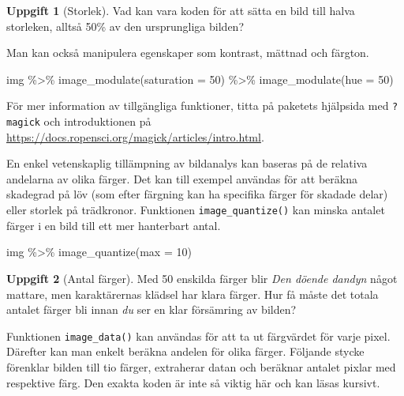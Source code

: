 \documentclass[
]{book}
\newenvironment{Shaded}{\begin{snugshade}}{\end{snugshade}}
\newcommand{\AttributeTok}[1]{\textcolor[rgb]{0.77,0.63,0.00}{#1}}
\newcommand{\DecValTok}[1]{\textcolor[rgb]{0.00,0.00,0.81}{#1}}
\newcommand{\FunctionTok}[1]{\textcolor[rgb]{0.00,0.00,0.00}{#1}}
\newcommand{\NormalTok}[1]{#1}
\newcommand{\SpecialCharTok}[1]{\textcolor[rgb]{0.00,0.00,0.00}{#1}}
\theoremstyle{definition}
\theoremstyle{definition}
\theoremstyle{definition}
\newtheorem{exercise}{Uppgift}[chapter]
\theoremstyle{definition}
\theoremstyle{remark}
\begin{document}
\begin{exercise}[Storlek]
Vad kan vara koden för att sätta en bild till halva storleken, alltså 50\% av den ursprungliga bilden?
\end{exercise}

Man kan också manipulera egenskaper som kontrast, mättnad och färgton.

\begin{Shaded}
\begin{Highlighting}[]
\NormalTok{img }\SpecialCharTok{\%\textgreater{}\%} 
  \FunctionTok{image\_modulate}\NormalTok{(}\AttributeTok{saturation =} \DecValTok{50}\NormalTok{) }\SpecialCharTok{\%\textgreater{}\%} 
  \FunctionTok{image\_modulate}\NormalTok{(}\AttributeTok{hue =} \DecValTok{50}\NormalTok{)}
\end{Highlighting}
\end{Shaded}

För mer information av tillgängliga funktioner, titta på paketets hjälpsida med \texttt{?magick} och introduktionen på \url{https://docs.ropensci.org/magick/articles/intro.html}.

En enkel vetenskaplig tillämpning av bildanalys kan baseras på de relativa andelarna av olika färger. Det kan till exempel användas för att beräkna skadegrad på löv (som efter färgning kan ha specifika färger för skadade delar) eller storlek på trädkronor. Funktionen \texttt{image\_quantize()} kan minska antalet färger i en bild till ett mer hanterbart antal.

\begin{Shaded}
\begin{Highlighting}[]
\NormalTok{img }\SpecialCharTok{\%\textgreater{}\%} \FunctionTok{image\_quantize}\NormalTok{(}\AttributeTok{max =} \DecValTok{10}\NormalTok{)}
\end{Highlighting}
\end{Shaded}

\begin{exercise}[Antal färger]
Med 50 enskilda färger blir \emph{Den döende dandyn} något mattare, men karaktärernas klädsel har klara färger. Hur få måste det totala antalet färger bli innan \emph{du} ser en klar försämring av bilden?
\end{exercise}

Funktionen \texttt{image\_data()} kan användas för att ta ut färgvärdet för varje pixel. Därefter kan man enkelt beräkna andelen för olika färger. Följande stycke förenklar bilden till tio färger, extraherar datan och beräknar antalet pixlar med respektive färg. Den exakta koden är inte så viktig här och kan läsas kursivt.
\end{document}
